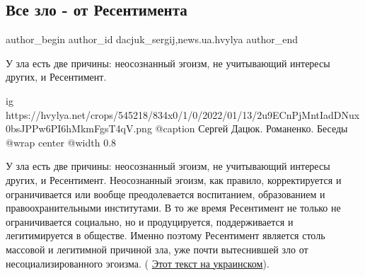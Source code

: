  
 
 
 
 
 
\subsection{Все зло - от Ресентимента}
\label{sec:11_02_2022.stz.news.ua.hvylya.1.vse_zlo_ot_ressentimenta}
 
\ifcmt
 author_begin
   author_id dacjuk_sergij,news.ua.hvylya
 author_end
\fi

\begin{zznagolos}
У зла есть две причины: неосознанный эгоизм, не учитывающий интересы других, и Ресентимент.
\end{zznagolos}

\ifcmt
  ig https://hvylya.net/crops/545218/834x0/1/0/2022/01/13/2u9ECnPjMntIadDNux0bsJPPw6PI6hMkmFgsT4qV.png
  @caption Сергей Дацюк. Романенко. Беседы
  @wrap center
  @width 0.8
\fi

У зла есть две причины: неосознанный эгоизм, не учитывающий интересы других, и
Ресентимент. Неосознанный эгоизм, как правило, корректируется и ограничивается
или вообще преодолевается воспитанием, образованием и правоохранительными
институтами. В то же время Ресентимент не только не ограничивается социально,
но и продуцируется, поддерживается и легитимируется в обществе. Именно поэтому
Ресентимент является столь массовой и легитимной причиной зла, уже почти
вытеснившей зло от несоциализированного эгоизма. (
\href{https://blogs.pravda.com.ua/authors/datsuk/6206047ca6715/}{Этот текст на
украинском}).



